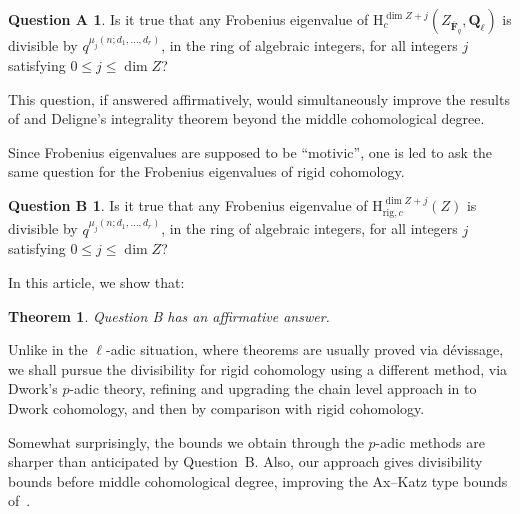 \documentclass{amsart}
\numberwithin{equation}{section}
\theoremstyle{plain}
\newtheorem*{theorem*}{Theorem}
\theoremstyle{definition}
\newtheorem*{questionA}{Question A}
\newtheorem*{questionB}{Question B}
\renewcommand{\mathbb}{\mathbf}
\begin{document}
\begin{questionA}
Is it true that any Frobenius eigenvalue of
\(\mathrm{H}^{\dim Z+j}_{c}(Z_{\overline{\mathbb{F}}_q},\mathbb{Q}_{\ell})\)
is divisible by \(q^{\mu_j(n;d_1,\ldots,d_r)}\), in the ring of algebraic integers, for all
integers \(j\) satisfying $0\leq j\leq \dim Z$?
\end{questionA}

This question, if answered affirmatively, would simultaneously improve the results of
\cite{esnault-katz:cohomological-divisibility} and Deligne's integrality
theorem \cite[Exposé XXI,~\S5]{sga7-2} beyond the middle cohomological degree.

Since Frobenius eigenvalues are supposed to be ``motivic'', one is led to ask
the same question for the Frobenius eigenvalues of rigid cohomology.

\begin{questionB}
Is it true that any Frobenius eigenvalue of
\(\mathrm{H}^{\dim Z+j}_{\mathrm{rig},c}(Z)\)
is divisible by \(q^{\mu_j(n;d_1,\ldots,d_r)}\), in the ring of algebraic integers, for all
integers \(j\) satisfying $0\leq j\leq \dim Z$?
\end{questionB}

In this article, we show that:

\begin{theorem*}
  Question B has an affirmative answer.
\end{theorem*}

Unlike in the \(\ell\)-adic situation, where theorems are usually proved via dévissage,
we shall pursue the divisibility for rigid cohomology using a different
method, via Dwork's $p$-adic theory, refining and upgrading the chain level
approach in \cite{wan:poles} to Dwork cohomology, and then by comparison with
rigid cohomology.

Somewhat surprisingly, the bounds we obtain through the
\(p\)-adic methods are sharper than anticipated by
Question~B. Also, our approach gives divisibility bounds
before middle cohomological degree, improving the Ax--Katz type
bounds of~\cite{esnault-katz:cohomological-divisibility}.
\end{document}

